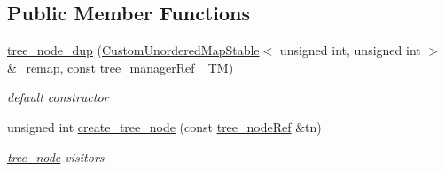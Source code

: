 \subsection*{Public Member Functions}
\begin{DoxyCompactItemize}
\item 
\hyperlink{structtree__node__dup_afe9798b8ebac6b2c69c2abd5423bcf5c}{tree\+\_\+node\+\_\+dup} (\hyperlink{custom__map_8hpp_a7314a7df1cdb3a3acf478ab86e95c226}{Custom\+Unordered\+Map\+Stable}$<$ unsigned int, unsigned int $>$ \&\+\_\+remap, const \hyperlink{tree__manager_8hpp_a96ff150c071ce11a9a7a1e40590f205e}{tree\+\_\+manager\+Ref} \+\_\+\+TM)
\begin{DoxyCompactList}\small\item\em default constructor \end{DoxyCompactList}\item 
unsigned int \hyperlink{structtree__node__dup_abec376e3d87e9de8ef2c9d271b185a0a}{create\+\_\+tree\+\_\+node} (const \hyperlink{tree__node_8hpp_a6ee377554d1c4871ad66a337eaa67fd5}{tree\+\_\+node\+Ref} \&tn)
\begin{DoxyCompactList}\small\item\em \hyperlink{classtree__node}{tree\+\_\+node} visitors \end{DoxyCompactList}\end{DoxyCompactItemize}
